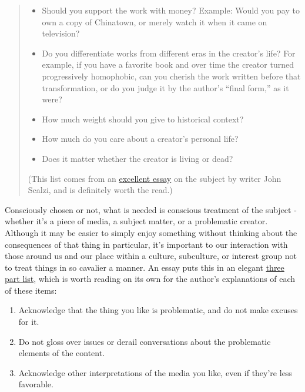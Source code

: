 \begin{quote}
\begin{itemize}
\tightlist
\item
  Should you support the work with money? Example: Would you pay to own a copy of Chinatown, or merely watch it when it came on television?
\item
  Do you differentiate works from different eras in the creator's life? For example, if you have a favorite book and over time the creator turned progressively homophobic, can you cherish the work written before that transformation, or do you judge it by the author's ``final form,'' as it were?
\item
  How much weight should you give to historical context?
\item
  How much do you care about a creator's personal life?
\item
  Does it matter whether the creator is living or dead?
\end{itemize}

(This list comes from an \href{http://whatever.scalzi.com/2014/03/19/reader-request-week-2014-6-enjoying-problematic-things/}{excellent essay} on the subject by writer John Scalzi, and is definitely worth the read.)
\end{quote}

Consciously chosen or not, what is needed is conscious treatment of the subject - whether it's a piece of media, a subject matter, or a problematic creator. Although it may be easier to simply enjoy something without thinking about the consequences of that thing in particular, it's important to our interaction with those around us and our place within a culture, subculture, or interest group not to treat things in so cavalier a manner. An essay puts this in an elegant \href{http://www.socialjusticeleague.net/2011/09/how-to-be-a-fan-of-problematic-things/}{three part list}, which is worth reading on its own for the author's explanations of each of these items:

\begin{enumerate}
\tightlist
\item
  Acknowledge that the thing you like is problematic, and do not make excuses for it.
\item
  Do not gloss over issues or derail conversations about the problematic elements of the content.
\item
  Acknowledge other interpretations of the media you like, even if they're less favorable.
\end{enumerate}

